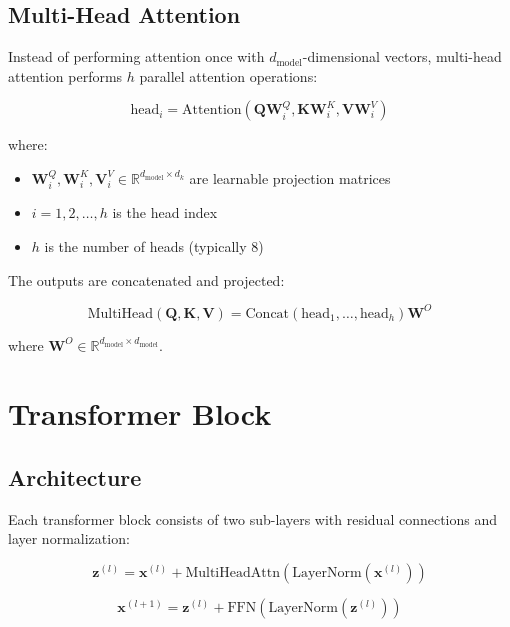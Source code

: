 \documentclass[11pt,a4paper]{article}
\begin{document}
\subsection{Multi-Head Attention}

Instead of performing attention once with $d_{\text{model}}$-dimensional vectors, multi-head attention performs $h$ parallel attention operations:

\begin{equation}
\text{head}_i = \text{Attention}(\mathbf{Q}\mathbf{W}_i^Q, \mathbf{K}\mathbf{W}_i^K, \mathbf{V}\mathbf{W}_i^V)
\end{equation}

where:
\begin{itemize}
    \item $\mathbf{W}_i^Q, \mathbf{W}_i^K, \mathbf{V}_i^V \in \mathbb{R}^{d_{\text{model}} \times d_k}$ are learnable projection matrices
    \item $i = 1, 2, \ldots, h$ is the head index
    \item $h$ is the number of heads (typically 8)
\end{itemize}

The outputs are concatenated and projected:

\begin{equation}
\text{MultiHead}(\mathbf{Q}, \mathbf{K}, \mathbf{V}) = \text{Concat}(\text{head}_1, \ldots, \text{head}_h)\mathbf{W}^O
\end{equation}

where $\mathbf{W}^O \in \mathbb{R}^{d_{\text{model}} \times d_{\text{model}}}$.

\section{Transformer Block}

\subsection{Architecture}

Each transformer block consists of two sub-layers with residual connections and layer normalization:

\begin{equation}
\mathbf{z}^{(l)} = \mathbf{x}^{(l)} + \text{MultiHeadAttn}(\text{LayerNorm}(\mathbf{x}^{(l)}))
\end{equation}

\begin{equation}
\mathbf{x}^{(l+1)} = \mathbf{z}^{(l)} + \text{FFN}(\text{LayerNorm}(\mathbf{z}^{(l)}))
\end{equation}
\end{document}
